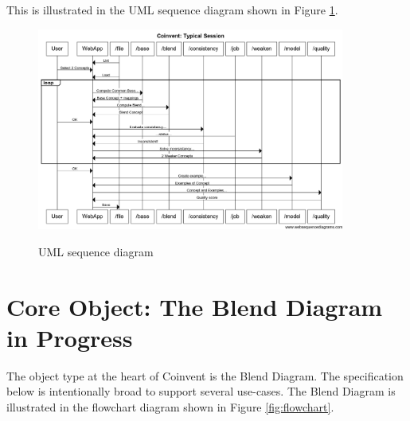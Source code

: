 \documentclass[10pt]{article}
\begin{document}
This is illustrated in the UML sequence diagram shown in Figure \ref{fig:sequence-diagram}.
\begin{figure}[!ht]
\includegraphics[width=0.9\textwidth]{sequence-diagram.png}
\label{fig:sequence-diagram}
\caption{UML sequence diagram}
\end{figure}





\section{Core Object: The Blend Diagram in Progress}\label{sec:bdip}

The object type at the heart of Coinvent is the Blend Diagram. The specification below is intentionally broad to support several use-cases. The Blend Diagram is illustrated in the flowchart diagram shown in Figure \ref{fig:flowchart}.
\end{document}
